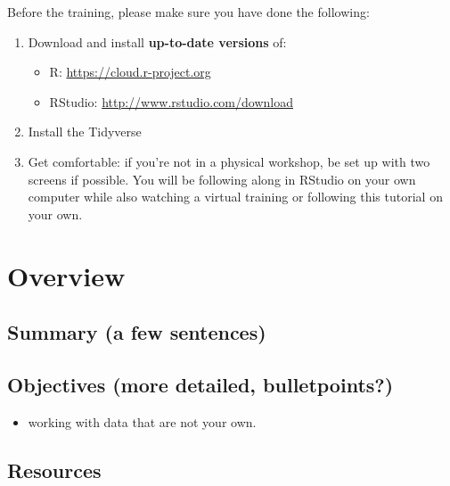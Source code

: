\documentclass[]{book}
\providecommand{\tightlist}{%
  \setlength{\itemsep}{0pt}\setlength{\parskip}{0pt}}
\begin{document}
Before the training, please make sure you have done the following:

\begin{enumerate}
\def\labelenumi{\arabic{enumi}.}
\tightlist
\item
  Download and install \textbf{up-to-date versions} of:

  \begin{itemize}
  \tightlist
  \item
    R: \url{https://cloud.r-project.org}
  \item
    RStudio: \url{http://www.rstudio.com/download}
  \end{itemize}
\item
  Install the Tidyverse
  \\
\item
  Get comfortable: if you're not in a physical workshop, be set up with two screens if possible. You will be following along in RStudio on your own computer while also watching a virtual training or following this tutorial on your own.
\end{enumerate}

\hypertarget{overview}{%
\chapter{Overview}\label{overview}}

\hypertarget{summary-a-few-sentences}{%
\section{Summary (a few sentences)}\label{summary-a-few-sentences}}

\hypertarget{objectives-more-detailed-bulletpoints}{%
\section{Objectives (more detailed, bulletpoints?)}\label{objectives-more-detailed-bulletpoints}}

\begin{itemize}
\tightlist
\item
  working with data that are not your own.
\end{itemize}

\hypertarget{resources}{%
\section{Resources}\label{resources}}
\end{document}
